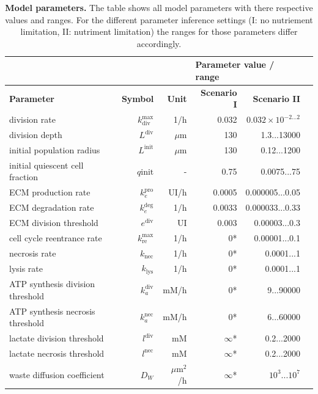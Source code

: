 \documentclass[10pt,letterpaper]{article}
\newcommand{\jh}[1]{{\color{red}#1}}
\newcommand{\sI}[1]{{\color{red}#1}}
\newcommand{\sII}[1]{{\color{blue}#1}}
\begin{document}
\begin{table}[!ht]
\begin{adjustwidth}{-0.5in}{0in} %
\caption{
{\bf Model parameters.} The table shows all model parameters with there respective values and ranges. For the different parameter inference settings (I: no nutriement limitation, II: nutriment limitation) the ranges for those parameters differ accordingly. }
\begin{tabular}{|p{6cm}|r|r|r|r|r|}
\hline
\multicolumn{3}{|l|}{\bf } & \multicolumn{2}{|l|}{\bf Parameter value / range}\\ \hline
{\bf Parameter} 					&{\bf Symbol} &{\bf Unit} &\sI{\bf Scenario I} &\sII{\bf Scenario II}\\ \hline
division rate 					&$k_{\text{div}}^{\max}$ & 1/h & 0.032 & $0.032 \times 10^{-2...2}$\\ \hline
division depth 					&$L^{\text{div}}$ & $\mu$m & 130 & 1.3...13000\\ \hline
initial population radius 			&$L^{\text{init}}$ & $\mu$m & 130 & 0.12...1200\\ \hline
initial quiescent cell fraction 		& $q{\text{init}}$ &-& 0.75& 0.0075...75\\ \hline
ECM production rate 			&$k_{e}^{\text{pro}}$  & \jh{UI}/h&0.0005 &0.000005...0.05\\ \hline
ECM degradation rate 			&$k_{e}^{\text{deg}}$ &1/h&0.0033 &0.000033...0.33\\ \hline
ECM division threshold 			&$e^{\text{div}}$ &\jh{UI} &0.003 &0.00003...0.3\\ \hline
\hline
cell cycle reentrance rate 			&$k^{\max}_{\text{re}}$ &1/h &0*&0.00001...0.1\\ \hline
necrosis rate 					&$k_{\text{nec}}$ &1/h&0*&0.0001...1\\ \hline
lysis rate 						&$k_{\text{lys}}$ &1/h&0*&0.0001...1\\ \hline
ATP synthesis division threshold 			&$k_a^{\text{div}}$ &mM/h& 0*& 9...90000\\ \hline
ATP synthesis necrosis threshold 			&$k_a^{\text{nec}}$ &mM/h& 0*& 6...60000\\ \hline
lactate division threshold 			&$l^{\text{div}}$  &mM&$\infty$* & 0.2...2000\\ \hline
lactate necrosis threshold 			&$l^{\text{nec}}$ &mM &$\infty$* & 0.2...2000\\ \hline
waste diffusion coefficient 			&$D_W$& $\mu$m$^{2}$/h&$\infty$*& $10^{3}...10^{7}$\\ \hline

\end{tabular}
\end{adjustwidth}
\end{table}
\end{document}
